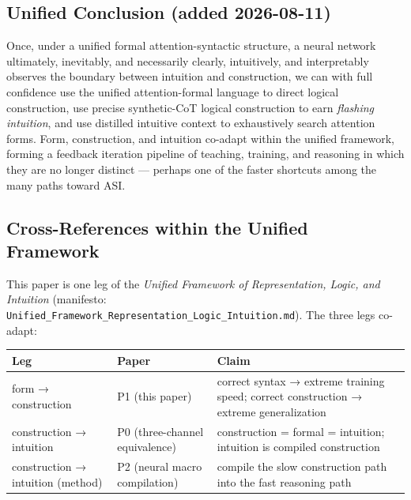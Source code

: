 \documentclass[
]{article}
\begin{document}
\subsection{Unified Conclusion (added
2026-08-11)}\label{unified-conclusion-added-2026-08-11}

Once, under a unified formal attention-syntactic structure, a neural
network ultimately, inevitably, and necessarily clearly, intuitively,
and interpretably observes the boundary between intuition and
construction, we can with full confidence use the unified
attention-formal language to direct logical construction, use precise
synthetic-CoT logical construction to earn \emph{flashing intuition},
and use distilled intuitive context to exhaustively search attention
forms. Form, construction, and intuition co-adapt within the unified
framework, forming a feedback iteration pipeline of teaching, training,
and reasoning in which they are no longer distinct --- perhaps one of
the faster shortcuts among the many paths toward ASI.

\subsection{Cross-References within the Unified
Framework}\label{cross-references-within-the-unified-framework}

This paper is one leg of the \emph{Unified Framework of Representation,
Logic, and Intuition} (manifesto:
\texttt{Unified\_Framework\_Representation\_Logic\_Intuition.md}). The
three legs co-adapt:

\begin{longtable}[]{@{}
  >{\raggedright\arraybackslash}p{}
  >{\raggedright\arraybackslash}p{}
  >{\raggedright\arraybackslash}p{}@{}}
\toprule\noalign{}
\begin{minipage}[b]{\linewidth}\raggedright
Leg
\end{minipage} & \begin{minipage}[b]{\linewidth}\raggedright
Paper
\end{minipage} & \begin{minipage}[b]{\linewidth}\raggedright
Claim
\end{minipage} \\
\midrule\noalign{}
\endhead
\bottomrule\noalign{}
\endlastfoot
form → construction & P1 (this paper) & correct syntax → extreme
training speed; correct construction → extreme generalization \\
construction → intuition & P0 (three-channel equivalence) & construction
= formal = intuition; intuition is compiled construction \\
construction → intuition (method) & P2 (neural macro compilation) &
compile the slow construction path into the fast reasoning path \\
\end{longtable}
\end{document}
